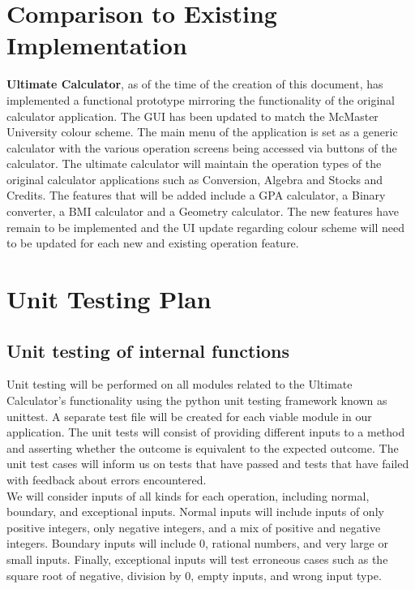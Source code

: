 \documentclass[12pt, titlepage]{article}
\begin{document}
\section{Comparison to Existing Implementation}	
\textbf{Ultimate Calculator}, as of the time of the creation of this document, has implemented a functional prototype mirroring the functionality of the original calculator application. The GUI has been updated to match the McMaster University colour scheme. The main menu of the application is set as a generic calculator with the various operation screens being accessed via buttons of the calculator. The ultimate calculator will maintain the operation types of the original calculator applications such as Conversion, Algebra and Stocks and Credits. The features that will be added include a GPA calculator, a Binary converter, a BMI calculator and a Geometry calculator. The new features have remain to be implemented and the UI update regarding colour scheme will need to be updated for each new and existing operation feature. 
				
\section{Unit Testing Plan}
		
\subsection{Unit testing of internal functions}
Unit testing will be performed on all modules related to the Ultimate Calculator's functionality using the python unit testing framework known as unittest. A separate test file will be created for each viable module in our application. The unit tests will consist of providing different inputs to a method and asserting whether the outcome is equivalent to the expected outcome. The unit test cases will inform us on tests that have passed and tests that have failed with feedback about errors encountered.\\

\noindent{}We will consider inputs of all kinds for each operation, including normal, boundary, and exceptional inputs. Normal inputs will include inputs of only positive integers, only negative integers, and a mix of positive and negative integers. Boundary inputs will include 0, rational numbers, and very large or small inputs. Finally, exceptional inputs will test erroneous cases such as the square root of negative, division by 0, empty inputs, and wrong input type.\\
\end{document}
